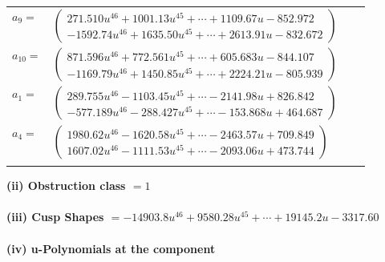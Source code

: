 \documentclass[1p]{elsarticle_modified}
\theoremstyle{definition}
\begin{document}
\begin{tabular}{m{7pt} m{180pt} m{7pt} m{180pt} }
\flushright $a_{9}=$&$\begin{pmatrix}271.510 u^{46}+1001.13 u^{45}+\cdots+1109.67 u-852.972\\-1592.74 u^{46}+1635.50 u^{45}+\cdots+2613.91 u-832.672\end{pmatrix}$ \\
\flushright $a_{10}=$&$\begin{pmatrix}871.596 u^{46}+772.561 u^{45}+\cdots+605.683 u-844.107\\-1169.79 u^{46}+1450.85 u^{45}+\cdots+2224.21 u-805.939\end{pmatrix}$ \\
\flushright $a_{1}=$&$\begin{pmatrix}289.755 u^{46}-1103.45 u^{45}+\cdots-2141.98 u+826.842\\-577.189 u^{46}-288.427 u^{45}+\cdots-153.868 u+464.687\end{pmatrix}$ \\
\flushright $a_{4}=$&$\begin{pmatrix}1980.62 u^{46}-1620.58 u^{45}+\cdots-2463.57 u+709.849\\1607.02 u^{46}-1111.53 u^{45}+\cdots-2093.06 u+473.744\end{pmatrix}$\\&\end{tabular}
\flushleft \textbf{(ii) Obstruction class $= 1$}\\~\\
\flushleft \textbf{(iii) Cusp Shapes $= -14903.8 u^{46}+9580.28 u^{45}+\cdots+19145.2 u-3317.60$}\\~\\
\newpage\renewcommand{\arraystretch}{1}
\flushleft \textbf{(iv) u-Polynomials at the component}\newline \\
\end{document}
